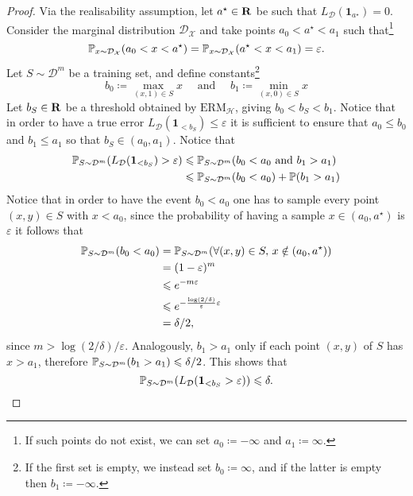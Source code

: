 \begin{proof}
    Via the realisability assumption, let \(a^{\star} \in \mathbf{R}\) be such that
    \(L_{\mathcal{D}}(\mathbf{1}_{a^{\star}}) = 0\). Consider the marginal distribution
    \(\mathcal{D}_{\mathcal{X}}\) and take points \(a_0 < a^{\star} < a_1\) such that\footnote{If such
        points do not exist, we can set \(a_0 \coloneq -\infty\) and \(a_1 \coloneq \infty\).}
    \[
        \operatorname{\mathbb{P}}_{x \sim \mathcal{D}_{\mathcal{X}}}(a_0 < x < a^{\star})
        = \operatorname{\mathbb{P}}_{x \sim \mathcal{D}_{\mathcal{X}}}(a^{\star} < x < a_1)
        = \varepsilon.
    \]
    Let \(S \sim \mathcal{D}^m\) be a training set, and define constants\footnote{If the first
        set is empty, we instead set \(b_0 \coloneq \infty\), and if the latter is empty then
        \(b_1 \coloneq -\infty\).}
    \[
        b_0 \coloneq \max_{(x, 1) \in S} x
        \quad \text{ and } \quad
        b_1 \coloneq \min_{(x, 0) \in S} x
    \]
    Let \(b_S \in \mathbf{R}\) be a threshold obtained by \(\text{ERM}_{\mathcal{H}}\), giving
    \(b_0 < b_S < b_1\). Notice that in order to have a true error
    \(L_{\mathcal{D}}(\mathbf{1}_{< b_S}) \leq \varepsilon\) it is sufficient to ensure that \(a_0 \leq b_0\)
    and \(b_1 \leq a_1\) so that \(b_S \in (a_0, a_1)\). Notice that
    \begin{align*}
        \operatorname{\mathbb{P}}_{S \sim \mathcal{D}^m}(L_{\mathcal{D}}(\mathbf{1}_{< b_S}) > \varepsilon)
         & \leqslant \operatorname{\mathbb{P}}_{S \sim \mathcal{D}^m}(b_0 < a_0 \text{ and } b_1 > a_1) \\
         & \leqslant \operatorname{\mathbb{P}}_{S \sim \mathcal{D}^m}(b_0 < a_0) + \operatorname{\mathbb{P}}(b_1 > a_1)
    \end{align*}
    Notice that in order to have the event \(b_0 < a_0\) one has to sample every point
    \((x, y) \in S\) with \(x < a_0\), since the probability of having a sample \(x \in
    (a_0, a^{\star})\) is \(\varepsilon\) it follows that
    \begin{align*}
        \operatorname{\mathbb{P}}_{S \sim \mathcal{D}^m}(b_0 < a_0)
         & = \operatorname{\mathbb{P}}_{S \sim \mathcal{D}^m}(\forall (x, y) \in S,\, x \notin (a_0, a^{\star})) \\
         & = (1 - \varepsilon)^m                                                             \\
         & \leqslant e^{-m \varepsilon}                                                           \\
         & \leqslant e^{- \frac{\log(2/\delta)}{\varepsilon} \varepsilon}                         \\
         & = \delta/2,
    \end{align*}
    since \(m > \log(2/\delta)/\varepsilon\). Analogously, \(b_1 > a_1\) only if each point
    \((x, y)\) of \(S\) has \(x > a_1\), therefore
    \(\operatorname{\mathbb{P}}_{S \sim \mathcal{D}^m}(b_1 > a_1) \leqslant \delta/2\).  This shows that
    \[
        \operatorname{\mathbb{P}}_{S \sim \mathcal{D}^m}(L_{\mathcal{D}}(\mathbf{1}_{< b_S} > \varepsilon)) \leqslant \delta.
    \]
\end{proof}

